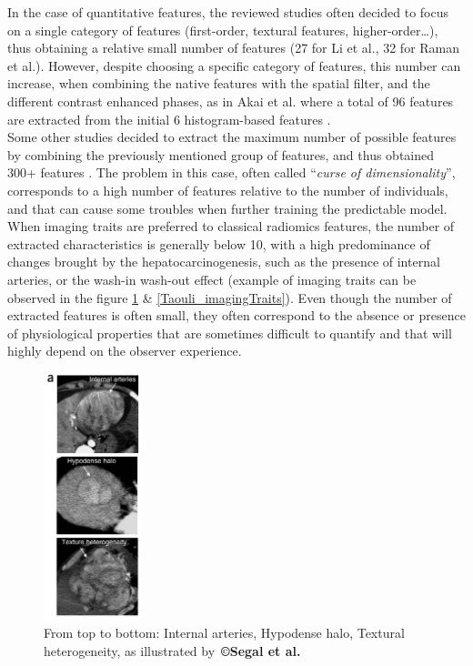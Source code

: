 In the case of quantitative features, the reviewed studies often decided
to focus on a single category of features (first-order, textural
features, higher-order\ldots{}), thus obtaining a relative small number
of features (27 for Li et al.\cite{Li2016}, 32 for Raman et al.\cite{Raman2015}).
However, despite choosing a specific category of features, this number
can increase, when combining the native features with the spatial
filter, and the different contrast enhanced phases, as in Akai
et al. where a total of 96 features are extracted from the initial 6
histogram-based features \cite{Akai2018}.\\
Some other studies decided to extract the maximum number of possible features by
combining the previously mentioned group of features, and thus obtained
300+ features \cite{Zhou2017a,Peng2018,Bakr2017}. The problem in this case, often called ``\emph{curse of
dimensionality}'', corresponds to a high number of features relative to
the number of individuals, and that can cause some troubles when further
training the predictable model. \\
When imaging traits are preferred to classical radiomics features, the
number of extracted characteristics is generally below 10, with a high
predominance of changes brought by the hepatocarcinogenesis, such as the
presence of internal arteries, or the wash-in wash-out effect (example
of imaging traits can be observed in the figure \ref{Segal_imagingTraits} \& \ref{Taouli_imagingTraits}). Even though
the number of extracted features is often small, they often correspond
to the absence or presence of physiological properties that are sometimes
difficult to quantify and that will highly depend on the observer
experience.

\begin{figure}[ht!]
\centering
\includegraphics[width=1.13125in,height=2.82813in]{./images/image3.png}
\caption{From top to bottom: Internal arteries, Hypodense halo, Textural heterogeneity, as illustrated by \textbf{©Segal et al.} \cite{Segal2007}}
\label{Segal_imagingTraits}
\end{figure}

